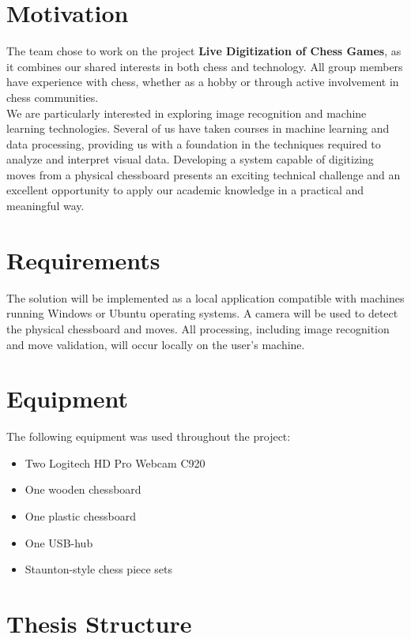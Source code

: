 \section{Motivation}

The team chose to work on the project \textbf{Live Digitization of Chess Games}, as it combines our shared interests in both chess and technology. All group members have experience with chess, whether as a hobby or through active involvement in chess communities. \\

We are particularly interested in exploring image recognition and machine learning technologies. Several of us have taken courses in machine learning and data processing, providing us with a foundation in the techniques required to analyze and interpret visual data. Developing a system capable of digitizing moves from a physical chessboard presents an exciting technical challenge and an excellent opportunity to apply our academic knowledge in a practical and meaningful way.

\section{Requirements}

The solution will be implemented as a local application compatible with machines running Windows or Ubuntu operating systems. A camera will be used to detect the physical chessboard and moves. All processing, including image recognition and move validation, will occur locally on the user's machine.

\newpage

\section{Equipment}
The following equipment was used throughout the project:

\begin{itemize}
    \item Two Logitech HD Pro Webcam C920
    \item One wooden chessboard
    \item One plastic chessboard
    \item One USB-hub
    \item Staunton-style chess piece sets
\end{itemize}

\section{Thesis Structure}

